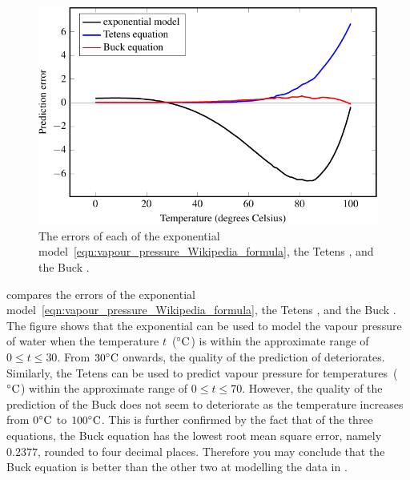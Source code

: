 \documentclass[a4paper,oneside,12pt]{article}
\begin{document}
\begin{problem}
{\begin{solution}
\begin{figure}[!htbp]
\centering
\includegraphics[scale=1.1]{image/11/vapour-pressure-errors.pdf}
\caption{%
  The errors of each of the exponential
  model~\eqref{eqn:vapour_pressure_Wikipedia_formula}, the Tetens
  , and the Buck
  .
}
\label{fig:vapour_pressure_errors}
\end{figure}

 compares the errors of the
exponential model~\eqref{eqn:vapour_pressure_Wikipedia_formula}, the
Tetens , and the Buck
.  The figure shows that the
exponential  can be
used to model the vapour pressure of water when the
temperature $t$~(${}^{\circ}\textrm{C}$) is within the approximate range of
$0 \leq t \leq 30$.  From ${30}^{\circ}\textrm{C}$ onwards, the quality of the
prediction of 
deteriorates.  Similarly, the Tetens
 can be used to predict vapour
pressure for temperatures~(${}^{\circ}\textrm{C}$) within the approximate range
of $0 \leq t \leq 70$.  However, the quality of the prediction of the
Buck  does not seem to deteriorate
as the temperature increases from ${0}^{\circ}\textrm{C}$ to ${100}^{\circ}\textrm{C}$.
This is further confirmed by the fact that of the three equations, the
Buck equation has the lowest root mean square error, namely~$0.2377$,
rounded to four decimal places.  Therefore you may conclude that the
Buck equation is better than the other two at modelling the data in
.
\end{solution}
}{}


\end{problem}
\end{document}
